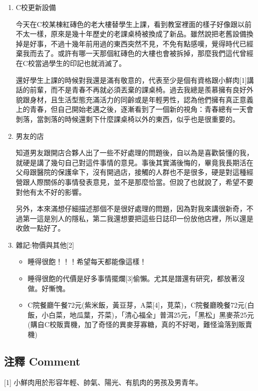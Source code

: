 \documentclass[
]{article}
\providecommand{\tightlist}{%
  \setlength{\itemsep}{0pt}\setlength{\parskip}{0pt}}
\begin{document}
\begin{enumerate}
\def\labelenumi{\arabic{enumi}.}
\item
  C校更新設備

  今天在C校某棟紅磚色的老大樓替學生上課，看到教室裡面的樣子好像跟以前不太一樣，原來是幾十年歷史的老課桌椅被換成了新品。雖然說把老舊設備換掉是好事，不過十幾年前用過的東西突然不見，不免有點感嘆，覺得時代已經棄我而去了。或許有哪一天那個紅磚色的大樓也會被拆掉，那麼我們這代曾經在C校當過學生的印記也就消滅了。

  還好學生上課的時候對我還是滿有敬意的，代表至少是個有資格跟小鮮肉{[}1{]}講話的前輩，而不是青春不再就必須丟棄的課桌椅。過去我總是羨慕擁有良好外貌跟身材，且生活型態充滿活力的同齡或是年輕男性，認為他們擁有真正意義上的青春，但自己開始老邁之後，逐漸看到了一個新的視角：青春總有一天會剝落，當剝落的時候還剩下什麼課桌椅以外的東西，似乎也是很重要的。
\item
  男友的店

  知道男友跟開店合夥人出了一些不好處理的問題後，自以為是喜歡裝懂的我，就硬是講了幾句自己對這件事情的意見。事後其實滿後悔的，畢竟我長期活在父母跟醫院的保護傘下，沒有開過店，接觸的人群也不是很多，硬是對這種經營跟人際關係的事情發表意見，並不是那麼恰當。但說了也就說了，希望不要對他有太不好的影響。

  另外，本來滿想仔細描述那個不是很好處理的問題，因為對我來講很新奇，不過第一這是別人的隱私，第二我還想要把這些日誌印一份放他店裡，所以還是收斂一點好了。
\item
  雜記:物價與其他{[}2{]}

  \begin{itemize}
  \tightlist
  \item
    睡得很飽！！！希望每天都能像這樣！
  \item
    睡得很飽的代價是好多事情擺爛{[}3{]}偷懶。尤其是譜還有研究，都放著沒做。好慚愧。
  \item
    C院餐廳午餐72元(紫米飯，黃豆芽，A菜{[}4{]}，莧菜)，C院餐廳晚餐72元(白飯，小白菜，地瓜葉，芥菜)，「清心福全」普洱25元，「黑松」黑麥茶25元(購自C校販賣機，加了奇怪的異麥芽寡糖，真的不好喝，難怪淪落到販賣機)
  \end{itemize}
\end{enumerate}

\hypertarget{ux6ce8ux91cb-comment-23}{%
\subsection{注釋 Comment}\label{ux6ce8ux91cb-comment-23}}

{[}1{]} 小鮮肉用於形容年輕、帥氣、陽光、有肌肉的男孩及男青年。
\end{document}
